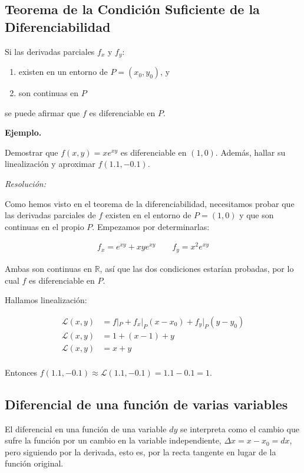 \subsection{Teorema de la Condición Suficiente de la Diferenciabilidad}

Si las derivadas parciales \(f_x\) y \(f_y\):
\begin{enumerate}
    \item existen en un entorno de \(P=(x_0,y_0)\), y
    \item son continuas en \(P\)
\end{enumerate}
se puede afirmar que \(f\) es diferenciable en \(P\).

\vspace{.5cm}
\textbf{Ejemplo.}

Demostrar que \(f(x,y)=xe^{xy}\) es diferenciable en \((1,0)\).
Además,
hallar su linealización y aproximar \(f(1.1,-0.1)\).

\textit{Resolución:}

Como hemos visto en el teorema de la diferenciabilidad,
necesitamos probar que las derivadas parciales de \(f\) existen en el entorno de
\(P = (1,0)\) y que son continuas en el propio \(P\).
Empezamos por determinarlas:

\begin{align*}
    f_x = e^{xy} + xye^{xy} \qquad f_y = x^{2}e^{xy}
\end{align*}

Ambas son continuas en \(\mathbb{R}\),
así que las dos condiciones estarían probadas,
por lo cual \(f\) es diferenciable en \(P\).

Hallamos linealización:

\begin{align*}
    \mathcal{L}(x,y) & = f|_P + f_x|_P(x - x_0) + f_y|_P(y - y_0) \\
    \mathcal{L}(x,y) & = 1 + (x - 1) + y                          \\
    \mathcal{L}(x,y) & = \boxed{x + y}                            \\
\end{align*}

Entonces \(f(1.1,-0.1) \approx \mathcal{L}(1.1,-0.1) = 1.1 - 0.1 = \boxed{1}\).

\subsection{Diferencial de una función de varias variables}

El diferencial en una función de una variable \(dy\)
se interpreta como el cambio que sufre la función
por un cambio en la variable independiente,
\(\Delta x = x - x_0 = dx\),
pero siguiendo por la derivada,
esto es,
por la recta tangente en lugar de la función original.

